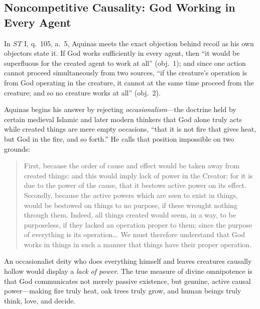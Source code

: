 \subsection{Noncompetitive Causality: God Working in Every Agent}

In \emph{ST} I, q.\ 105, a.\ 5, Aquinas meets the exact objection behind recoil as his own objectors state it. If God works sufficiently in every agent, then ``it would be superfluous for the created agent to work at all'' (obj.\ 1); and since one action cannot proceed simultaneously from two sources, ``if the creature's operation is from God operating in the creature, it cannot at the same time proceed from the creature; and so no creature works at all'' (obj.\ 2).

Aquinas begins his answer by rejecting \emph{occasionalism}---the doctrine held by certain medieval Islamic and later modern thinkers that God alone truly acts while created things are mere empty occasions, ``that it is not fire that gives heat, but God in the fire, and so forth.'' He calls that position impossible on two grounds:

\begin{quote}
First, because the order of cause and effect would be taken away from created things: and this would imply lack of power in the Creator: for it is due to the power of the cause, that it bestows active power on its effect. Secondly, because the active powers which are seen to exist in things, would be bestowed on things to no purpose, if these wrought nothing through them. Indeed, all things created would seem, in a way, to be purposeless, if they lacked an operation proper to them; since the purpose of everything is its operation\dots\ We must therefore understand that God works in things in such a manner that things have their proper operation.
\end{quote}

An occasionalist deity who does everything himself and leaves creatures causally hollow would display a \emph{lack of power}. The true measure of divine omnipotence is that God communicates not merely passive existence, but genuine, active causal power---making fire truly heat, oak trees truly grow, and human beings truly think, love, and decide.

